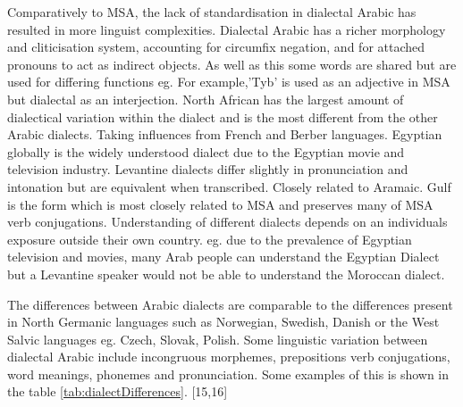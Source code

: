 Comparatively to MSA, the lack of standardisation in dialectal Arabic has resulted in more linguist complexities.
Dialectal Arabic has a richer morphology and cliticisation system, accounting for circumfix negation, 
and for attached pronouns to act as indirect objects. As well as this some words are shared but are used for
differing functions eg. For example,'Tyb' is used as an adjective in MSA but dialectal as an interjection. 
North African has the largest amount of dialectical variation within the dialect and is the most different from the other Arabic dialects. Taking influences from French and Berber languages. 
Egyptian globally is the widely understood dialect due to the Egyptian movie and television industry. 
Levantine dialects differ slightly in pronunciation and intonation but are equivalent when transcribed. Closely related to Aramaic. 
Gulf is the form which is most closely related to MSA and preserves many of MSA verb conjugations. 
Understanding of different dialects depends on an individuals exposure outside their own country. eg. due to the prevalence of Egyptian television and movies,
many Arab people can understand the Egyptian Dialect but a Levantine speaker would not be able to understand 
the Moroccan dialect. 

The differences between Arabic dialects are comparable to the differences present in North Germanic languages such as
Norwegian, Swedish, Danish or the West Salvic languages eg. Czech, Slovak, Polish. Some linguistic variation between dialectal Arabic include incongruous morphemes, prepositions
verb conjugations, word meanings, phonemes and pronunciation. Some examples of this is shown in the table \ref{tab:dialectDifferences}. [15,16]\\

